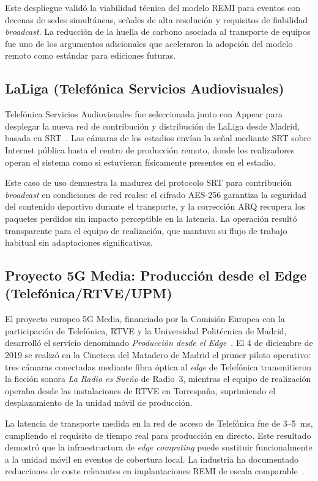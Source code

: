 Este despliegue validó la viabilidad técnica del modelo REMI para eventos con decenas de
sedes simultáneas, señales de alta resolución y requisitos de fiabilidad \textit{broadcast}. La
reducción de la huella de carbono asociada al transporte de equipos fue uno de los
argumentos adicionales que aceleraron la adopción del modelo remoto como estándar para
ediciones futuras.

\subsection{LaLiga (Telefónica Servicios Audiovisuales)}

Telefónica Servicios Audiovisuales fue seleccionada junto con Appear para desplegar la
nueva red de contribución y distribución de LaLiga desde Madrid, basada en
SRT~\cite{tsa_laliga_srt_2025}. Las cámaras de los estadios envían la señal mediante SRT
sobre Internet pública hasta el centro de producción remoto, donde los realizadores
operan el sistema como si estuvieran físicamente presentes en el estadio.

Este caso de uso demuestra la madurez del protocolo SRT para contribución \textit{broadcast}
en condiciones de red reales: el cifrado AES-256 garantiza la seguridad del contenido
deportivo durante el transporte, y la corrección ARQ recupera los paquetes perdidos sin
impacto perceptible en la latencia. La operación resultó transparente para el equipo de
realización, que mantuvo su flujo de trabajo habitual sin adaptaciones significativas.

\subsection{Proyecto 5G Media: Producción desde el Edge (Telefónica/RTVE/UPM)}

El proyecto europeo 5G Media, financiado por la Comisión Europea con la participación
de Telefónica, \ac{RTVE} y la Universidad Politécnica de Madrid, desarrolló el servicio
denominado \textit{Producción desde el Edge}~\cite{rtve_5gmedia_2019}. El 4 de
diciembre de 2019 se realizó en la Cineteca del Matadero de Madrid el primer piloto
operativo: tres cámaras conectadas mediante fibra óptica al \textit{edge} de Telefónica
transmitieron la ficción sonora \textit{La Radio es Sueño} de Radio~3, mientras el
equipo de realización operaba desde las instalaciones de \acs{RTVE} en Torrespaña,
suprimiendo el desplazamiento de la unidad móvil de producción.

La latencia de transporte medida en la red de acceso de Telefónica fue de 3--5~ms,
cumpliendo el requisito de tiempo real para producción en directo. Este
resultado demostró que la infraestructura de \textit{edge computing} puede sustituir
funcionalmente a la unidad móvil en eventos de cobertura local. La industria ha documentado
reducciones de coste relevantes en implantaciones REMI de escala comparable~\cite{tmbroadcast_remi}.


